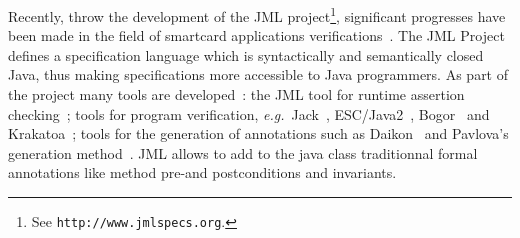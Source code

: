Recently, throw the development of the JML
project\footnote{See \texttt{http://www.jmlspecs.org}.},
 significant progresses have been made in the field of
smartcard applications verifications~\cite{BreunesseCHJ03}.
The JML Project defines
a specification language which is syntactically and
semantically closed Java, thus making
specifications more accessible to Java programmers. As part
of the project many tools are developed~\cite{Burdy-etal03}: the JML
tool for runtime assertion checking~\cite{Preliminary}; tools for
program verification, \emph{e.g.}\/~Jack~\cite{BurdyRL03},
ESC/Java2~\cite{CokK04}, Bogor~\cite{bogor2005} 
and Krakatoa~\cite{marche03jlap}; tools for
the generation of annotations such as Daikon~\cite{ErnstCGN01} and
Pavlova's generation method~\cite{Enforcing}. JML allows to add to the
java class traditionnal formal annotations like method 
pre-and postconditions and invariants.%


